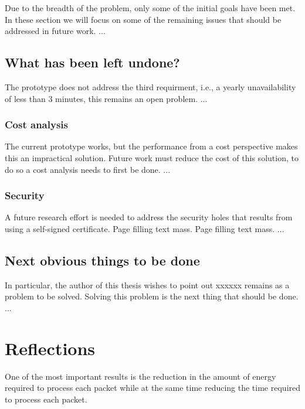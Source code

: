 \documentclass[english]{kththesis}
\begin{document}
Due to the breadth of the problem, only some of the initial goals have been
met. In these section we will focus on some of the remaining issues that
should be addressed in future work. ...

\subsection{What has been left undone?}
\label{what-has-been-left-undone}

The prototype does not address the third requirment, i.e., a yearly
unavailability of less than 3 minutes, this remains an open problem. ...

\subsubsection{Cost analysis}

The current prototype works, but the performance from a cost perspective makes
this an impractical solution. Future work must reduce the cost of this
solution, to do so a cost analysis needs to first be done. ...

\subsubsection{Security}

A future research effort is needed to address the security holes that results
from using a self-signed certificate. Page filling text mass. Page filling
text mass. ...


\subsection{Next obvious things to be done}

In particular, the author of this thesis wishes to point out xxxxxx remains as
a problem to be solved. Solving this problem is the next thing that should be
done. ...

\section{Reflections}
\label{sec:reflections}

One of the most important results is the reduction in the amount of
energy required to process each packet while at the same time reducing the
time required to process each packet.
\end{document}
